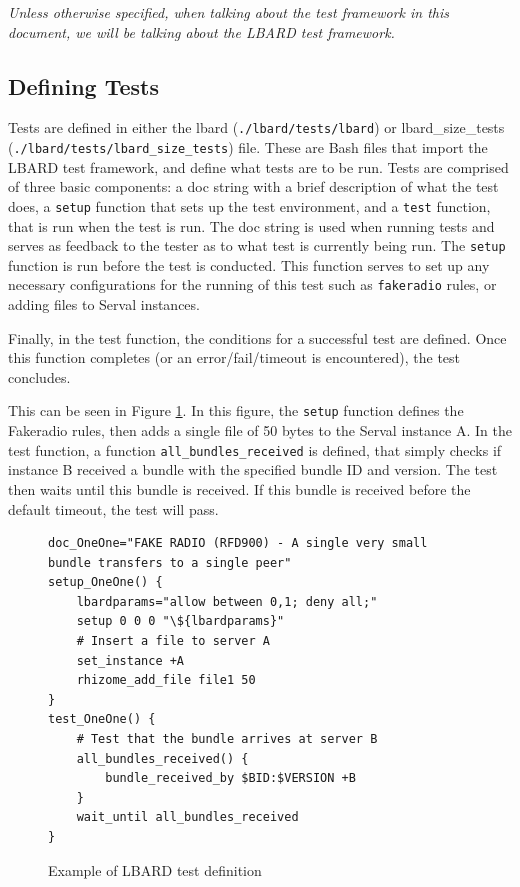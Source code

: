 \emph{Unless otherwise specified, when talking about the test framework in this document, we will be talking about the LBARD test framework.}


\subsection{Defining Tests}
Tests are defined in either the lbard (\texttt{./lbard/tests/lbard}) or lbard\_size\_tests (\texttt{./lbard/tests/lbard\_size\_tests}) file. 
These are Bash files that import the LBARD test framework, and define what tests are to be run.
Tests are comprised of three basic components: a doc string with a brief description of what the test does, a \texttt{setup} function that sets up the test environment, and a \texttt{test} function, that is run when the test is run.
The doc string is used when running tests and serves as feedback to the tester as to what test is currently being run.
The \texttt{setup} function is run before the test is conducted. 
This function serves to set up any necessary configurations for the running of this test such as \texttt{fakeradio} rules, or adding files to Serval instances.

Finally, in the test function, the conditions for a successful test are defined. Once this function completes (or an error/fail/timeout is encountered), the test concludes.


This can be seen in Figure \ref{fig:testDefinition}. 
In this figure, the \texttt{setup} function defines the Fakeradio rules, then adds a single file of 50 bytes to the Serval instance A. 
In the test function, a function \texttt{all\_bundles\_received} is defined, that simply checks if instance B received a bundle with the specified bundle ID and version. 
The test then waits until this bundle is received. 
If this bundle is received before the default timeout, the test will pass.

\lstset{language=bash,
showstringspaces=false,
numbers=left,
}

\begin{figure}
    \begin{centering}

\begin{lstlisting}[breaklines, frame=single]
doc_OneOne="FAKE RADIO (RFD900) - A single very small bundle transfers to a single peer"
setup_OneOne() {
    lbardparams="allow between 0,1; deny all;"
    setup 0 0 0 "\${lbardparams}" 
    # Insert a file to server A
    set_instance +A
    rhizome_add_file file1 50
}
test_OneOne() {
    # Test that the bundle arrives at server B
    all_bundles_received() {
        bundle_received_by $BID:$VERSION +B 
    }
    wait_until all_bundles_received
} 
\end{lstlisting}
        \caption{Example of LBARD test definition}
        \label{fig:testDefinition}
    \end{centering}
\end{figure}

